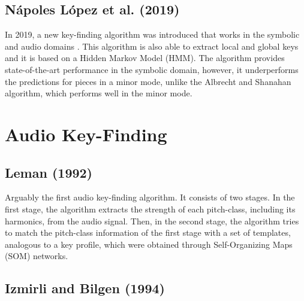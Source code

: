 \subsection{N\'apoles L\'opez et al. (2019)}
In 2019, a new key-finding algorithm was introduced that works in the symbolic and audio domains \cite{napoles_lopez_key-finding_2019}. This algorithm is also able to extract local and global keys and it is based on a Hidden Markov Model (HMM). The algorithm provides state-of-the-art performance in the symbolic domain, however, it underperforms the predictions for pieces in a minor mode, unlike the Albrecht and Shanahan algorithm, which performs well in the minor mode.

\section{Audio Key-Finding}

\subsection{Leman (1992)}


Arguably the first audio key-finding algorithm. It consists of two stages. In the first stage, the algorithm extracts the strength of each pitch-class, including its harmonics, from the audio signal. Then, in the second stage, the algorithm tries to match the pitch-class information of the first stage with a set of templates, analogous to a key profile, which were obtained through Self-Organizing Maps (SOM) networks. 

\subsection{Izmirli and Bilgen (1994)}


